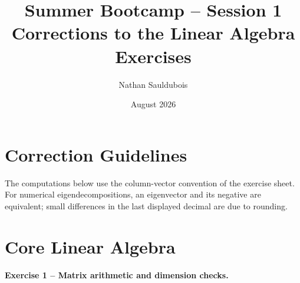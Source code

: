 \documentclass[10pt]{article}
\title{Summer Bootcamp -- Session 1\\Corrections to the Linear Algebra Exercises}
\author{Nathan Sauldubois}
\date{August 2026}
\begin{document}
\maketitle

\section*{Correction Guidelines}

The computations below use the column-vector convention of the exercise sheet.
For numerical eigendecompositions, an eigenvector and its negative are equivalent;
small differences in the last displayed decimal are due to rounding.

\section{Core Linear Algebra}

\paragraph{Exercise 1 -- Matrix arithmetic and dimension checks.}
\end{document}
